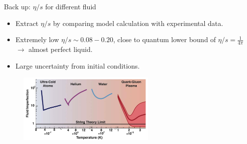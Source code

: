 \documentclass[11pt]{beamer}
\begin{document}
\begin{frame}[noframenumbering]{Back up: $\eta/s$ for different fluid}
\begin{itemize}
\item Extract $\eta/s$ by comparing model calculation with experimental data.
\item Extremely low $\eta/s \sim 0.08 - 0.20$, close to quantum lower bound of $\eta/s = \frac{1}{4\pi}$ $\rightarrow$ almost perfect liquid.
\item \color{red}Large uncertainty from initial conditions.
\end{itemize}
\begin{figure}
\begin{center}
\includegraphics[width=0.6\textwidth]{pics/eta_s.png} 
\end{center} 	
\end{figure}
\end{frame}
\end{document}
